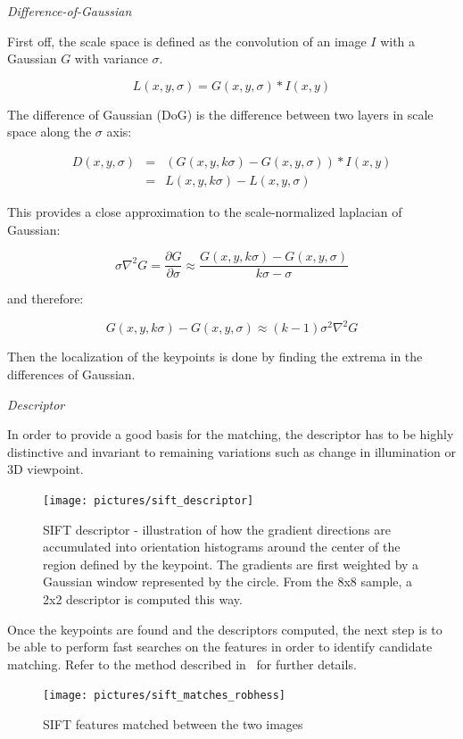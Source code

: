 \emph{Difference-of-Gaussian}

First off, the scale space is defined as the convolution of an image $I$ with a Gaussian $G$ with variance $\sigma$.

\[ L(x,y,\sigma) = G(x,y,\sigma) * I(x,y) \]

The difference of Gaussian (DoG) is the difference between two layers in scale space along the $\sigma$ axis:

\[
\begin{array}{rcl}
D(x,y,\sigma) & = & (G(x,y, k\sigma) - G(x,y,\sigma)) * I(x,y) \\
 & = & L(x,y,k\sigma) - L(x,y,\sigma)
\end{array}
\] 

This provides a close approximation to the scale-normalized laplacian of Gaussian:

\[ \sigma\nabla^2G = \frac{\partial G}{\partial \sigma} \approx \frac{G(x,y,k\sigma)-G(x,y,\sigma)}{k\sigma - \sigma} \]

and therefore:

\[ G(x,y,k\sigma) - G(x,y,\sigma) \approx (k-1)\sigma^2\nabla^2G \]

Then the localization of the keypoints is done by finding the extrema in the differences of Gaussian. 


\emph{Descriptor}

In order to provide a good basis for the matching, the descriptor has to be highly distinctive and invariant to remaining variations such as change in illumination or 3D viewpoint. 

\begin{figure}[H]
\centering
\texttt{[image: pictures/sift\_descriptor]}
\caption{SIFT descriptor - illustration of how the gradient directions are accumulated into orientation histograms around the center of the region defined by the keypoint. The gradients are first weighted by a Gaussian window represented by the circle. From the 8x8 sample, a 2x2 descriptor is computed this way.}
\end{figure}

Once the keypoints are found and the descriptors computed, the next step is to be able to perform fast searches on the features in order to identify candidate matching. Refer to the method described in~\cite{lowe_2004_sift} for further details.

\begin{figure}[H]
\centering
\texttt{[image: pictures/sift\_matches\_robhess]}
\caption{SIFT features matched between the two images}
\end{figure}


